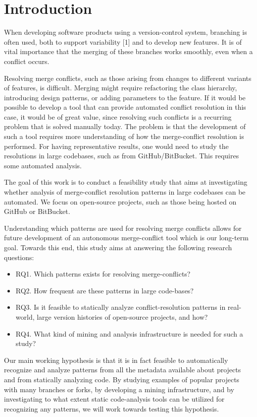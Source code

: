 \chapter{Introduction}
\setlength{\parindent}{0pt}
When developing software products using a version-control system, branching is often used, both to support variability [1] and to develop new features. It is of vital importance that the merging of these branches works smoothly, even when a conflict occurs.

Resolving merge conflicts, such as those arising from changes to different variants of features, is difficult. Merging might require refactoring the class hierarchy, introducing design patterns, or adding parameters to the feature. If it would be possible to develop a tool that can provide automated conflict resolution in this case, it would be of great value, since resolving such conflicts is a recurring problem that is solved manually today. The problem is that the development of such a tool requires more understanding of how the merge-conflict resolution is performed. For having representative results, one would need to study the resolutions in large codebases, such as from GitHub/BitBucket. This requires some automated analysis.

The goal of this work is to conduct a feasibility study that aims at investigating whether analysis of merge-conflict resolution patterns in large codebases can be automated. We focus on open-source projects, such as those being hosted on GitHub or BitBucket.

Understanding which patterns are used for resolving merge conflicts allows for future development of an autonomous merge-conflict tool which is our long-term goal. Towards this end, this study aims at answering the following research questions:
\begin{itemize}
\item RQ1. Which patterns exists for resolving merge-conflicts?
\item RQ2. How frequent are these patterns in large code-bases?
\item RQ3. Is it feasible to statically analyze conflict-resolution patterns in real-world, large version histories of open-source projects, and how?
\item RQ4. What kind of mining and analysis infrastructure is needed for such a study?
\end{itemize}

Our main working hypothesis is that it is in fact feasible to automatically recognize and analyze patterns from all the metadata available about projects and from statically analyzing code. By studying examples of popular projects with many branches or forks, by developing a mining infrastructure, and by investigating to what extent static code-analysis tools can be utilized for recognizing any patterns, we will work towards testing this hypothesis.




